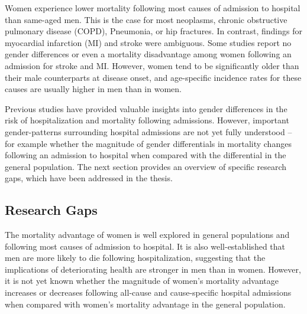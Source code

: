 Women experience lower mortality following most causes of admission to 
hospital than same-aged men. This is the case for most neoplasms,\citep{cook2011,
jung2012female,radkiewicz2017sex} chronic obstructive pulmonary disease 
(COPD),\citep{de2009sex,gonzalez2011gender} Pneumonia,\citep{kaplan2002hospitalized,
reade2009differences} or hip fractures.\citep{kannegaard2010excess,katsoulis2017excess} 
In contrast, findings for myocardial infarction (MI) and stroke were 
ambiguous. Some studies report no gender differences or even a mortality 
disadvantage among women following an admission for stroke\citep{appelros2009sex,
appelros2010review,kim2010gender,andersen2011predictors} and MI\citep{simon2006impact,
nielsen2014sex}. However, women tend to be significantly older than 
their male counterparts at disease onset, and age-specific incidence 
rates for these causes are usually higher in men than in women.\citep{kim2010gender,
appelros2009sex}

Previous studies have provided valuable insights into gender 
differences in the risk of hospitalization and mortality 
following admissions. However, important gender-patterns 
surrounding hospital admissions are not yet fully understood -- 
for example whether the magnitude of gender differentials in 
mortality changes following an admission to hospital when 
compared with the differential in the general population. 
The next section provides an overview of specific research 
gaps, which have been addressed in the thesis. \\



\subsection{Research Gaps}

The mortality advantage of women is well explored in general populations 
and following most causes of admission to hospital. It is also well-established 
that men are more likely to die following hospitalization, suggesting that 
the implications of deteriorating health are stronger in men than in 
women.\citep{hanlon2000link,case2005sex,hubbard2011frailty} However, it 
is not yet known whether the magnitude of women's  mortality advantage 
increases or decreases following all-cause and cause-specific hospital 
admissions when compared with women's mortality advantage in the general 
population. 

